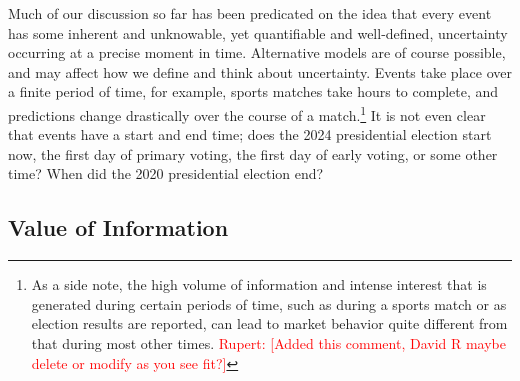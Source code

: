 \documentclass[sigconf,anonymous]{aamas}   %
\newcommand{\rupert}[1]{\ifnum\Chatty=1 \textcolor{red}   {Rupert: [#1]} \fi}
\begin{document}
Much of our discussion so far has been predicated on the idea that every event has some inherent and unknowable, yet quantifiable and well-defined, uncertainty occurring at a precise moment in time. Alternative models are of course possible, and may affect how we define and think about uncertainty. Events take place over a finite period of time, for example, sports matches take hours to complete, and predictions change drastically over the course of a match.\footnote{As a side note, the high volume of information and intense interest that is generated during certain periods of time, such as during a sports match or as election results are reported, can lead to market behavior quite different from that during most other times.\rupert{Added this comment, David R maybe delete or modify as you see fit?}} It is not even clear that events have a start and end time; does the 2024 presidential election start now, the first day of primary voting, the first day of early voting, or some other time? When did the 2020 presidential election end? 


%

\subsection{Value of Information}
\end{document}
